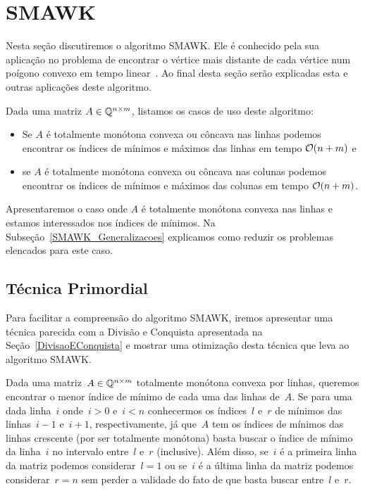 \section{SMAWK}
\label{SMAWK}


Nesta seção discutiremos o algoritmo SMAWK. Ele é conhecido pela sua aplicação no problema de encontrar o vértice mais distante de cada vértice num poígono convexo em tempo linear~\cite{Aggarwal:1987}. Ao final desta seção serão explicadas esta e outras aplicações deste algoritmo.  

Dada uma matriz $A \in \mathbb{Q}^{n \times m}$, listamos os casos de uso deste algoritmo:
\begin{itemize}
    \item Se $A$ é totalmente monótona convexa ou côncava nas linhas podemos encontrar os índices de mínimos e máximos das linhas em tempo $\mathcal{O}(n + m)$ e
    \item se $A$ é totalmente monótona convexa ou côncava nas colunas podemos encontrar os índices de mínimos e máximos das colunas em tempo $\mathcal{O}(n + m)$.
\end{itemize}

Apresentaremos o caso onde $A$ é totalmente monótona convexa nas linhas e estamos interessados nos índices de mínimos. Na Subseção~\ref{SMAWK_Generalizacoes} explicamos como reduzir os problemas elencados para este caso.

\subsection{Técnica Primordial}
Para facilitar a compreensão do algoritmo SMAWK, iremos apresentar uma técnica parecida com a Divisão e Conquista apresentada na Seção~\ref{DivisaoEConquista} e mostrar uma otimização desta técnica que leva ao algoritmo SMAWK.

Dada uma matriz~$A \in \mathbb{Q}^{n \times m}$ totalmente monótona convexa por linhas, queremos encontrar o menor índice de mínimo de cada uma das linhas de~$A$. Se para uma dada linha~$i$ onde~$i > 0$ e~$i < n$ conhecermos os índices~$l$ e~$r$ de mínimos das linhas~$i-1$ e~$i+1$, respectivamente, já que~$A$ tem os índices de mínimos das linhas crescente (por ser totalmente monótona) basta buscar o índice de mínimo da linha~$i$ no intervalo entre~$l$ e~$r$ (inclusive). Além disso, se~$i$ é a primeira linha da matriz podemos considerar~$l = 1$ ou se~$i$ é a última linha da matriz podemos considerar~$r = n$ sem perder a validade do fato de que basta buscar entre~$l$ e~$r$.  

